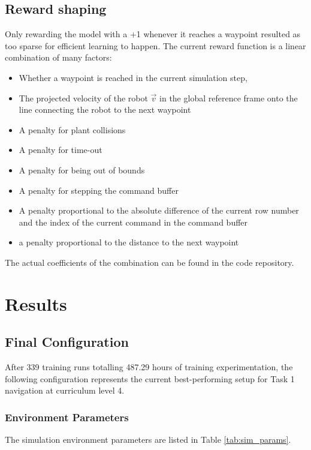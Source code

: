 \documentclass[11pt,a4paper,twocolumn]{article}
\begin{document}
\subsection{Reward shaping}
Only rewarding the model with a +1 whenever it reaches a waypoint resulted as too sparse for efficient learning to happen. The current reward function is a linear combination of many factors:
\begin{itemize}
    \item Whether a waypoint is reached in the current simulation step,
    \item The projected velocity of the robot $\vec{v}$ in the global reference frame onto the line connecting the robot to the next waypoint 
    \item A penalty for plant collisions
    \item A penalty for time-out
    \item A penalty for being out of bounds
    \item A penalty for stepping the command buffer
    \item A penalty proportional to the absolute difference of the current row number and the index of the current command in the command buffer
    \item a penalty proportional to the distance to the next waypoint
    
\end{itemize}

The actual coefficients of the combination can be found in the code repository.

\section{Results}

\subsection{Final Configuration}
After 339 training runs totalling 487.29 hours of training experimentation, the following configuration represents the current best-performing setup for Task 1 navigation at curriculum level 4.

\subsubsection{Environment Parameters}
The simulation environment parameters are listed in Table \ref{tab:sim_params}.
\end{document}
